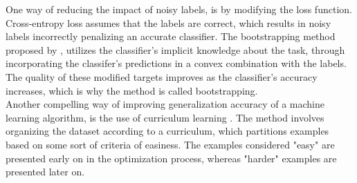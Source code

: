 One way of reducing the impact of noisy labels, is by modifying the loss function. Cross-entropy loss assumes that the labels are correct, which results in noisy labels incorrectly penalizing an accurate classifier. The bootstrapping method proposed by \citep{Reed_noisy_labels_bootstrapping}, utilizes the classifier's implicit knowledge about the task, through incorporating the classifer's predictions in a convex combination with the labels. The quality of these modified targets improves as the classifier's accuracy increases, which is why the method is called bootstrapping.\\

Another compelling way of improving generalization accuracy of a machine learning algorithm, is the use of curriculum learning \citep{Bengio_curriculumlearning}. The method involves organizing the dataset according to a curriculum, which partitions examples based on some sort of criteria of easiness. The examples considered "easy" are presented early on in the optimization process, whereas "harder" examples are presented later on.
